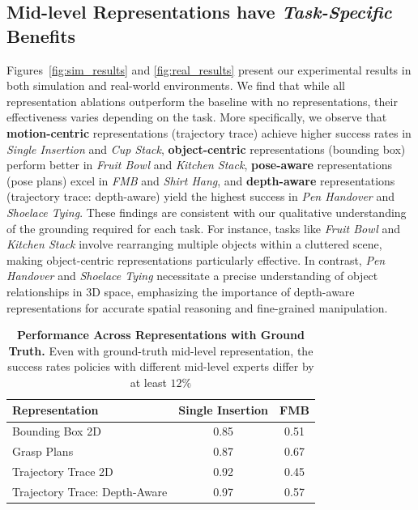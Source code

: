 \documentclass[conference,dvipsnames]{IEEEtran}
\begin{document}
\subsection{Mid-level Representations have \textit{Task-Specific} Benefits}
Figures~\ref{fig:sim_results} and \ref{fig:real_results} present our experimental results in both simulation and real-world environments. We find that while all representation ablations outperform the baseline with no representations, their effectiveness varies depending on the task. More specifically, we observe that \textbf{motion-centric} representations (trajectory trace) achieve higher success rates in \textit{Single Insertion} and \textit{Cup Stack}, \textbf{object-centric} representations (bounding box) perform better in \textit{Fruit Bowl} and \textit{Kitchen Stack}, \textbf{pose-aware} representations (pose plans) excel in \textit{FMB} and \textit{Shirt Hang}, and \textbf{depth-aware} representations (trajectory trace: depth-aware) yield the highest success in \textit{Pen Handover} and \textit{Shoelace Tying}. These findings are consistent with our qualitative understanding of the grounding required for each task. For instance, tasks like \textit{Fruit Bowl} and \textit{Kitchen Stack} involve rearranging multiple objects within a cluttered scene, making object-centric representations particularly effective. In contrast, \textit{Pen Handover} and \textit{Shoelace Tying} necessitate a precise understanding of object relationships in 3D space, emphasizing the importance of depth-aware representations for accurate spatial reasoning and fine-grained manipulation.


\begin{table}[!htb]
    \centering
    \begin{tabular}{l|c|c}
    \toprule
    \textbf{Representation} & \textbf{Single Insertion} &\textbf{FMB}\\
    \midrule
    Bounding Box 2D & 0.85 & 0.51 \\
    Grasp Plans & 0.87 & 0.67 \\
    Trajectory Trace 2D & 0.92 & 0.45 \\
    Trajectory Trace: Depth-Aware & 0.97 & 0.57  \\
    \bottomrule
    \end{tabular}
    \caption{\textbf{Performance Across Representations with Ground Truth.} Even with ground-truth mid-level representation, the success rates policies with different mid-level experts differ by at least $12\%$}
    \label{table:ground_truth_representations}
\end{table}
\end{document}

